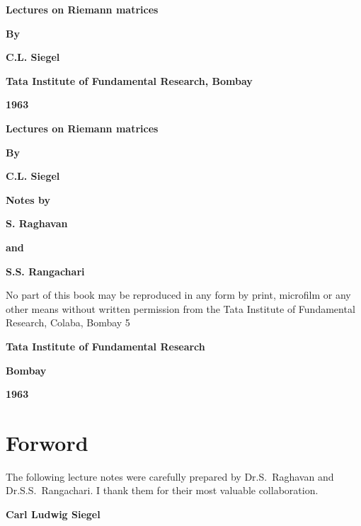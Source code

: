 \thispagestyle{empty}
\begin{center}
{\Large\bf Lectures on Riemann matrices}
\vskip 1cm

{\bf By}
\medskip

{\large\bf C.L. Siegel}
\vfill


{\bf Tata Institute of Fundamental Research,  Bombay}



{\bf 1963}
\end{center}
\eject



\thispagestyle{empty}
\begin{center}
{\Large\bf Lectures on Riemann matrices}
\medskip

{\bf By}
\medskip

{\large\bf C.L. Siegel}
\vfill

{\bf Notes by}
\medskip

{\large\bf S. Raghavan}
\medskip

{\bf and}
\medskip

{\large\bf S.S. Rangachari}
\vfill


\parbox{0.7\textwidth}{No part of this book may be reproduced in any 
form by print, microfilm or any other means without written permission
from the Tata Institute of Fundamental Research, Colaba, Bombay 5}
\vfill 



{\bf Tata Institute of Fundamental Research}

{\bf Bombay}

{\bf 1963}
\end{center}
\eject

\thispagestyle{empty}
\chapter*{Forword}


The following lecture notes were carefully prepared by Dr.S.~Raghavan
and Dr.S.S.~Rangachari. I thank them for their most valuable
collaboration.
\bigskip

\hfill{\large\bf Carl Ludwig Siegel}
